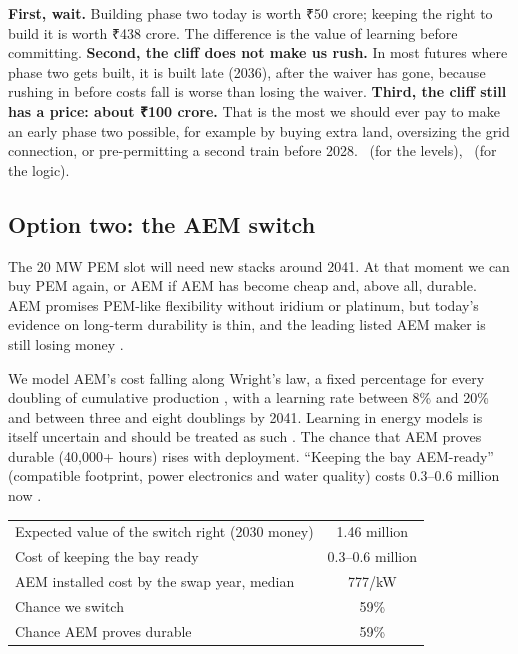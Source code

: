 \begin{finding}
\textbf{First, wait.} Building phase two today is worth ₹50 crore; keeping the right to build it is worth ₹438 crore. The difference is the value of learning before committing. \textbf{Second, the cliff does not make us rush.} In most futures where phase two gets built, it is built late (2036), after the waiver has gone, because rushing in before costs fall is worse than losing the waiver. \textbf{Third, the cliff still has a price: about ₹100 crore.} That is the most we should ever pay to make an early phase two possible, for example by buying extra land, oversizing the grid connection, or pre-permitting a second train before 2028. \confL\ (for the levels), \confM\ (for the logic).
\end{finding}

\subsection{Option two: the AEM switch}
The 20 MW PEM slot will need new stacks around 2041. At that moment we can buy PEM again, or AEM if AEM has become cheap and, above all, durable. AEM promises PEM-like flexibility without iridium or platinum, but today's evidence on long-term durability is thin, and the leading listed AEM maker is still losing money \cite{enapter2026,enki2026}.

We model AEM's cost falling along Wright's law, a fixed percentage for every doubling of cumulative production \cite{wright1936}, with a learning rate between 8\% and 20\% and between three and eight doublings by 2041. Learning in energy models is itself uncertain and should be treated as such \cite{zeyen2023}. The chance that AEM proves durable (40,000+ hours) rises with deployment. ``Keeping the bay AEM-ready'' (compatible footprint, power electronics and water quality) costs \usd{}0.3--0.6 million now \estd.

\begin{center}\tablefont
\begin{tabularx}{\textwidth}{@{}L c@{}}
\toprule
{} & \\ \midrule
Expected value of the switch right (2030 money) & \usd{}1.46 million\\
Cost of keeping the bay ready & \usd{}0.3--0.6 million\\
AEM installed cost by the swap year, median & \usd{}777/kW\\
Chance we switch & 59\%\\
Chance AEM proves durable & 59\%\\
\bottomrule
\end{tabularx}
\end{center}

